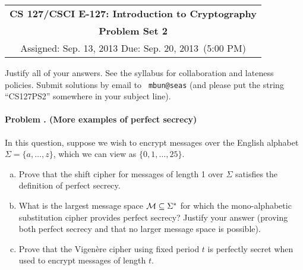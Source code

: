\documentclass[11pt]{article}
\newcommand{\psnum}{2}
\newcommand{\assdate}{Sep. 13, 2013 \hspace{-5em}}
\newcommand{\duedate}{Sep. 20, 2013}
\newcounter{problem}
\newenvironment{problem}[1]{\stepcounter{problem}
\paragraph{Problem \theproblem. #1}}{}
\begin{document}
\begin{center}
\renewcommand{\arraystretch}{2}
\begin{tabular}{|c|}
\hline
{\large \bfseries CS 127/CSCI E-127: Introduction to Cryptography} \\

{\large \bfseries Problem Set \psnum}\\
Assigned: \assdate
\hspace{20em} Due: \duedate\ (5:00 PM)\\
\hline
\end{tabular}
\renewcommand{\arraystretch}{1}
\end{center}
\vspace{1cm}

\noindent Justify all of your answers.  See the syllabus for
collaboration and lateness policies. Submit solutions by email to {\tt
mbun@seas} (and please put the string ``CS127PS2'' somewhere in your subject line).

\begin{problem}{(More examples of perfect secrecy)}
In this question, suppose we wish to encrypt messages over the English alphabet $\Sigma = \{a, \dots, z\}$, which we can view as $\{0, 1, \dots, 25\}$.
\begin{enumerate}[a.]
\item Prove that the shift cipher for messages of length 1 over $\Sigma$
satisfies the definition of perfect secrecy.
\item What is the largest message space $\mathcal{M} \subseteq \Sigma^*$ for which the mono-alphabetic substitution cipher provides perfect secrecy? Justify your answer (proving both perfect secrecy and that no larger message space is possible).
\item Prove that the Vigen\`{e}re cipher using fixed period $t$ is perfectly secret when used to encrypt messages of length $t$.
\end{enumerate}
\end{problem}
\end{document}
